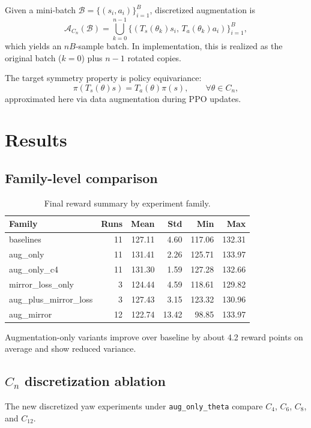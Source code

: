 \documentclass{article}
\begin{document}
Given a mini-batch $\mathcal{B}=\{(s_i,a_i)\}_{i=1}^{B}$, discretized augmentation is
\begin{equation}
\mathcal{A}_{C_n}(\mathcal{B})=
\bigcup_{k=0}^{n-1}
\{(T_s(\theta_k)s_i,\,T_a(\theta_k)a_i)\}_{i=1}^{B},
\end{equation}
which yields an $nB$-sample batch. In implementation, this is realized as the original batch ($k=0$) plus $n-1$ rotated copies.

The target symmetry property is policy equivariance:
\begin{equation}
\pi\!\left(T_s(\theta)s\right)=T_a(\theta)\pi(s),\qquad \forall\theta\in C_n,
\end{equation}
approximated here via data augmentation during PPO updates.

\section{Results}
\subsection{Family-level comparison}
\begin{table}[t]
\caption{Final reward summary by experiment family.}
\label{tab:family}
\centering
\begin{tabular}{lrrrrr}
\toprule
Family & Runs & Mean & Std & Min & Max \\
\midrule
baselines & 11 & 127.11 & 4.60 & 117.06 & 132.31 \\
aug\_only & 11 & 131.41 & 2.26 & 125.71 & 133.97 \\
aug\_only\_c4 & 11 & 131.30 & 1.59 & 127.28 & 132.66 \\
mirror\_loss\_only & 3 & 124.44 & 4.59 & 118.61 & 129.82 \\
aug\_plus\_mirror\_loss & 3 & 127.43 & 3.15 & 123.32 & 130.96 \\
aug\_mirror & 12 & 122.74 & 13.42 & 98.85 & 133.97 \\
\bottomrule
\end{tabular}
\end{table}

Augmentation-only variants improve over baseline by about 4.2 reward points on average and show reduced variance.

\subsection{$C_n$ discretization ablation}
The new discretized yaw experiments under \texttt{aug\_only\_theta} compare $C_4$, $C_6$, $C_8$, and $C_{12}$.
\end{document}
